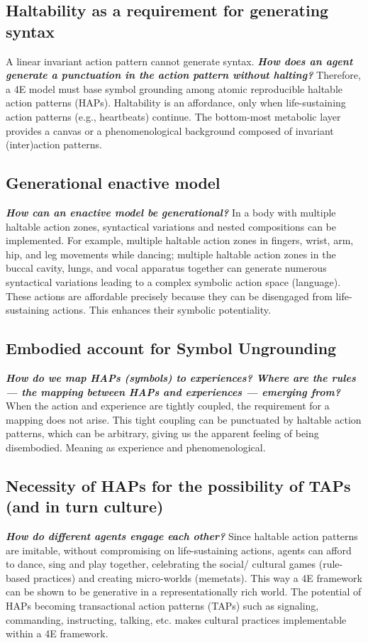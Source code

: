 \subsection{Haltability as a requirement for generating syntax} A linear invariant action pattern cannot generate syntax. \textbf{\textit{How does an agent generate a punctuation in the action pattern without halting?}} Therefore, a 4E model must base symbol grounding among atomic reproducible haltable action patterns (HAPs). Haltability is an affordance, only when life-sustaining action patterns (e.g., heartbeats) continue. The bottom-most metabolic layer provides a canvas or a phenomenological background composed of invariant (inter)action patterns.

\subsection{Generational enactive model} \textbf{\textit{How can an enactive model be generational?}} In a body with multiple haltable action zones, syntactical variations and nested compositions can be implemented. For example, multiple haltable action zones in fingers, wrist, arm, hip, and leg movements while dancing; multiple haltable action zones in the buccal cavity, lungs, and vocal apparatus together can generate numerous syntactical variations leading to a complex symbolic action space (language). These actions are affordable precisely because they can be disengaged from life-sustaining actions. This enhances their symbolic potentiality.

\subsection{Embodied account for Symbol Ungrounding} \textbf{\textit{How do we map HAPs (symbols) to experiences? Where are the rules —  the mapping between HAPs and experiences — emerging from?}} When the action and experience are tightly coupled, the requirement for a mapping does not arise. This tight coupling can be punctuated by haltable action patterns, which can be arbitrary, giving us the apparent feeling of being disembodied. Meaning as experience and phenomenological.

\subsection{Necessity of HAPs for the possibility of TAPs (and in turn culture)} \textbf{\textit{How do different agents engage each other?}} Since haltable action patterns are imitable, without compromising on life-sustaining actions, agents can afford to dance, sing and play together, celebrating the social/ cultural games (rule-based practices) and creating micro-worlds (memetats). This way a 4E framework can be shown to be generative in a representationally rich world. The potential of HAPs becoming transactional action patterns (TAPs) such as signaling, commanding, instructing, talking, etc. makes cultural practices implementable within a 4E framework.


